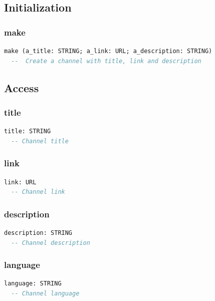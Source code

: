 \subsection{Initialization}
\label{sec:channel-initialization}

\subsubsection{make}

\begin{lstlisting}[language=Eiffel]
make (a_title: STRING; a_link: URL; a_description: STRING)
  --  Create a channel with title, link and description
\end{lstlisting}

\subsection{Access}
\label{sec:channel-access}

\subsubsection{title}

\begin{lstlisting}[language=Eiffel]
title: STRING
  -- Channel title
\end{lstlisting}

\subsubsection{link}

\begin{lstlisting}[language=Eiffel]
link: URL
  -- Channel link
\end{lstlisting}

\subsubsection{description}

\begin{lstlisting}[language=Eiffel]
description: STRING
  -- Channel description
\end{lstlisting}

\subsubsection{language}

\begin{lstlisting}[language=Eiffel]
language: STRING
  -- Channel language
\end{lstlisting}

